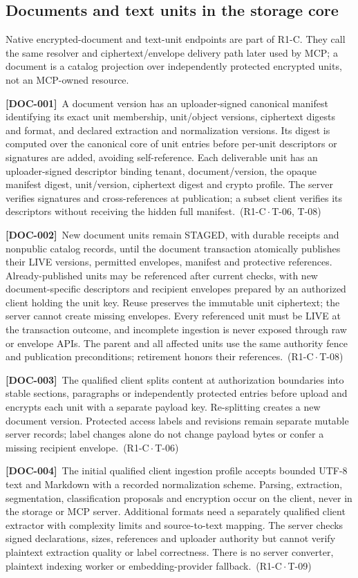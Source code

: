 \documentclass[11pt,a4paper]{article}
\newcommand{\reqtag}[2]{{\footnotesize\color{accent}(#1\,$\cdot$\,#2)}}
\newcommand{\req}[4]{\par\noindent\hypertarget{req:#1}{\textbf{[#1]}}\ #4\ \reqtag{#2}{#3}\par}
\begin{document}
\subsection{Documents and text units in the storage core}
Native encrypted-document and text-unit endpoints are part of R1-C. They call the same resolver and ciphertext/envelope delivery path later used by MCP; a document is a catalog projection over independently protected encrypted units, not an MCP-owned resource.
\req{DOC-001}{R1-C}{T-06, T-08}{A document version has an uploader-signed canonical manifest identifying its exact unit membership, unit/object versions, ciphertext digests and format, and declared extraction and normalization versions. Its digest is computed over the canonical core of unit entries before per-unit descriptors or signatures are added, avoiding self-reference. Each deliverable unit has an uploader-signed descriptor binding tenant, document/version, the opaque manifest digest, unit/version, ciphertext digest and crypto profile. The server verifies signatures and cross-references at publication; a subset client verifies its descriptors without receiving the hidden full manifest.}
\req{DOC-002}{R1-C}{T-08}{New document units remain STAGED, with durable receipts and nonpublic catalog records, until the document transaction atomically publishes their LIVE versions, permitted envelopes, manifest and protective references. Already-published units may be referenced after current checks, with new document-specific descriptors and recipient envelopes prepared by an authorized client holding the unit key. Reuse preserves the immutable unit ciphertext; the server cannot create missing envelopes. Every referenced unit must be LIVE at the transaction outcome, and incomplete ingestion is never exposed through raw or envelope APIs. The parent and all affected units use the same authority fence and publication preconditions; retirement honors their references.}
\req{DOC-003}{R1-C}{T-06}{The qualified client splits content at authorization boundaries into stable sections, paragraphs or independently protected entries before upload and encrypts each unit with a separate payload key. Re-splitting creates a new document version. Protected access labels and revisions remain separate mutable server records; label changes alone do not change payload bytes or confer a missing recipient envelope.}
\req{DOC-004}{R1-C}{T-09}{The initial qualified client ingestion profile accepts bounded UTF-8 text and Markdown with a recorded normalization scheme. Parsing, extraction, segmentation, classification proposals and encryption occur on the client, never in the storage or MCP server. Additional formats need a separately qualified client extractor with complexity limits and source-to-text mapping. The server checks signed declarations, sizes, references and uploader authority but cannot verify plaintext extraction quality or label correctness. There is no server converter, plaintext indexing worker or embedding-provider fallback.}
\end{document}
